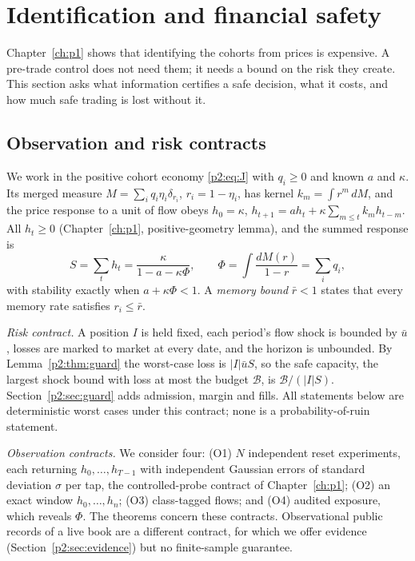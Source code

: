     \section{Identification and financial safety}\label{p2:sec:infosafety}

    Chapter~\ref{ch:p1} shows that identifying the cohorts from prices is expensive. A pre-trade control does not need them; it needs a bound on the risk they create. This section asks what information certifies a safe decision, what it costs, and how much safe trading is lost without it.

    \subsection{Observation and risk contracts}\label{p2:sec:contracts}
We work in the positive cohort economy \eqref{p2:eq:J} with $q_i\ge0$ and known $a$ and $\kappa$. Its merged measure $M=\sum_iq_i\eta_i\delta_{r_i}$, $r_i=1-\eta_i$, has kernel $k_m=\int r^m\,dM$, and the price response to a unit of flow obeys $h_0=\kappa$, $h_{t+1}=ah_t+\kappa\sum_{m\le t}k_mh_{t-m}$. All $h_t\ge0$ (Chapter~\ref{ch:p1}, positive-geometry lemma), and the summed response is
\begin{equation}\label{p2:eq:SPhi}
S=\sum_th_t=\frac{\kappa}{1-a-\kappa\Phi},\qquad \Phi=\int\frac{dM(r)}{1-r}=\sum_iq_i ,
\end{equation}
with stability exactly when $a+\kappa\Phi<1$. A \emph{memory bound} $\bar r<1$ states that every memory rate satisfies $r_i\le\bar r$.

\emph{Risk contract.} A position $I$ is held fixed, each period's flow shock is bounded by $\bar u$, losses are marked to market at every date, and the horizon is unbounded. By Lemma~\ref{p2:thm:guard} the worst-case loss is $|I|\bar uS$, so the safe capacity, the largest shock bound with loss at most the budget $\mathcal B$, is $\mathcal B/(|I|S)$. Section~\ref{p2:sec:guard} adds admission, margin and fills. All statements below are deterministic worst cases under this contract; none is a probability-of-ruin statement.

\emph{Observation contracts.} We consider four: (O1) $N$ independent reset experiments, each returning $h_0,\ldots,h_{T-1}$ with independent Gaussian errors of standard deviation $\sigma$ per tap, the controlled-probe contract of Chapter~\ref{ch:p1}; (O2) an exact window $h_0,\ldots,h_n$; (O3) class-tagged flows; and (O4) audited exposure, which reveals $\Phi$. The theorems concern these contracts. Observational public records of a live book are a different contract, for which we offer evidence (Section~\ref{p2:sec:evidence}) but no finite-sample guarantee.

